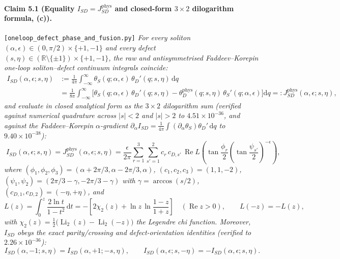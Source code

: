 \documentclass[11pt,a4paper]{article}
\newcommand{\dd}{\mathrm{d}}
\newcommand{\Rea}{\operatorname{Re}}
\newcommand{\Li}{\operatorname{Li}}
\begin{document}
\paragraph{Claim 5.1 (Equality $I_{SD} = J_{SD}^{\mathrm{phys}}$ and closed-form $3\times 2$ dilogarithm formula, (c)).}
\texttt{[oneloop\_defect\_phase\_and\_fusion.py]}
\emph{For every soliton $(\alpha,\epsilon) \in (0,\pi/2)\times\{+1,-1\}$ and every
defect $(s,\eta) \in (\mathbb{R}\setminus\{\pm 1\})\times\{+1,-1\}$, the raw and
antisymmetrised Faddeev--Korepin one-loop soliton--defect continuum integrals
coincide:
\begin{align}\label{eq:ISD_eq_JSD}
  I_{SD}(\alpha,\epsilon;s,\eta)
  &:= \frac{1}{4\pi}\int_{-\infty}^\infty \theta_S(q;\alpha,\epsilon)\,\theta_D'(q;s,\eta)\,\dd q \nonumber\\
  &= \frac{1}{8\pi}\int_{-\infty}^\infty \Big[\theta_S(q;\alpha,\epsilon)\,\theta_D'(q;s,\eta)
    - \theta_D^{\mathrm{phys}}(q;s,\eta)\,\theta_S'(q;\alpha,\epsilon)\Big]\dd q
  =: J_{SD}^{\mathrm{phys}}(\alpha,\epsilon;s,\eta),
\end{align}
and evaluate in closed analytical form as the $3\times 2$ dilogarithm sum
(verified against numerical quadrature across $|s|<2$ and $|s|>2$ to
$4.51\times 10^{-36}$, and against the Faddeev--Korepin $\alpha$-gradient
$\partial_\alpha I_{SD} = \frac{1}{4\pi}\int (\partial_\alpha\theta_S)\theta_D'\,\dd q$
to $9.40\times 10^{-38}$):
\begin{equation}\label{eq:ISD_closed}
  \boxed{\;
  I_{SD}(\alpha,\epsilon;s,\eta) = J_{SD}^{\mathrm{phys}}(\alpha,\epsilon;s,\eta)
  = \frac{\epsilon}{2\pi}\sum_{r=1}^3\sum_{s'=1}^2 c_r\,c_{D,s'}\,
    \Rea L\!\left(\tan\frac{\phi_r}{2}\left(\tan\frac{\psi_{s'}}{2}\right)^{-\epsilon}\right),
  \;}
\end{equation}
where $(\phi_1,\phi_2,\phi_3) = (\alpha+2\pi/3,\alpha-2\pi/3,\alpha)$,
$(c_1,c_2,c_3) = (1,1,-2)$, $(\psi_1,\psi_2) = (2\pi/3-\gamma,-2\pi/3-\gamma)$
with $\gamma = \arccos(s/2)$, $(c_{D,1},c_{D,2}) = (-\eta,+\eta)$, and
\begin{equation}\label{eq:L_def}
  L(z) = \int_0^z \frac{2\ln t}{1-t^2}\,\dd t
  = -\left[2\chi_2(z) + \ln z\,\ln\frac{1-z}{1+z}\right] \quad (\Rea z > 0), \qquad
  L(-z) = -L(z),
\end{equation}
with $\chi_2(z) = \frac{1}{2}\big(\Li_2(z)-\Li_2(-z)\big)$ the Legendre chi
function. Moreover, $I_{SD}$ obeys the exact parity/crossing and defect-orientation
identities (verified to $2.26\times 10^{-36}$):
\begin{equation}\label{eq:ISD_symmetries}
  I_{SD}(\alpha,-1;s,\eta) = I_{SD}(\alpha,+1;-s,\eta), \qquad
  I_{SD}(\alpha,\epsilon;s,-\eta) = -I_{SD}(\alpha,\epsilon;s,\eta).
\end{equation}}
\end{document}
